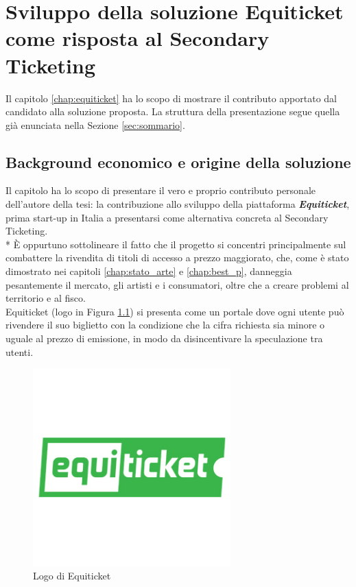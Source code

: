 \chapter{Sviluppo della soluzione Equiticket come risposta al Secondary Ticketing}
Il capitolo \ref{chap:equiticket} ha lo scopo di mostrare il contributo apportato dal candidato alla soluzione proposta. La struttura della presentazione segue quella già enunciata nella Sezione \ref{sec:sommario}.
\label{chap:equiticket}
\section{Background economico e origine della soluzione} \label{sec:background}
Il capitolo ha lo scopo di presentare il vero e proprio contributo personale dell'autore della tesi: la contribuzione allo sviluppo della piattaforma \emph{\textbf{Equiticket}}, prima start-up in Italia a presentarsi come alternativa concreta al Secondary Ticketing. \\*
\`E oppurtuno sottolineare il fatto che il progetto si concentri principalmente sul combattere la rivendita di titoli di accesso a prezzo maggiorato, che, come è stato dimostrato nei capitoli \ref{chap:stato_arte} e \ref{chap:best_p}, danneggia pesantemente il mercato, gli artisti e i consumatori, oltre che a creare problemi al territorio e al fisco. \\
Equiticket (logo in Figura \ref{logoequi}) si presenta come un portale dove ogni utente può rivendere il suo biglietto con la condizione che la cifra richiesta sia minore o uguale al prezzo di emissione, in modo da disincentivare la speculazione tra utenti. 
\begin{figure}[htbp]
	\centering
	\includegraphics[width=0.68\textwidth]{chapter4/immagini/logo300}
	\caption{Logo di Equiticket}
	\label{logoequi}
\end{figure}
